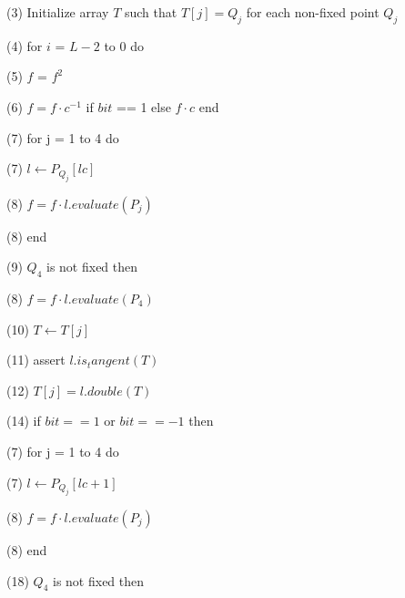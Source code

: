(3) Initialize array $T$ such that $\displaystyle T[j] = Q_j $ for each non-fixed point $Q_j$ \newline

(4) for $i$ = $L-2$ to $0$ do \newline

(5) \indent $f$ = $f^2$ \newline

(6) \indent \indent $\displaystyle f = f \cdot c^{-1}$ if $bit$ == 1 else $\displaystyle f \cdot c$ end \newline

(7) \indent for j = 1 to 4 do \newline

(7) \indent \indent $\displaystyle l \leftarrow P_{Q_j}[lc] $ \newline

(8) \indent \indent $\displaystyle f = f \cdot l.evaluate(P_j) $ \newline 

(8) \indent end \newline

(9) \indent $Q_4$ is not fixed then \newline

(8) \indent $\displaystyle f = f \cdot l.evaluate(P_4) $ \newline 

(10) \indent $\displaystyle T \leftarrow T[j] $ \newline

(11) \indent assert $\displaystyle l.is_tangent(T) $ \newline

(12) \indent $\displaystyle T[j] = l.double(T) $ \newline

(14) \indent if $bit == 1$ or $bit == -1 $ then \newline

(7) \indent \indent for j = 1 to 4 do \newline

(7) \indent \indent \indent $\displaystyle l \leftarrow P_{Q_j}[lc + 1] $ \newline

(8) \indent \indent \indent $\displaystyle f = f \cdot l.evaluate(P_j) $ \newline 

(8) \indent \indent end \newline

(18) \indent \indent $Q_4$ is not fixed then \newline

